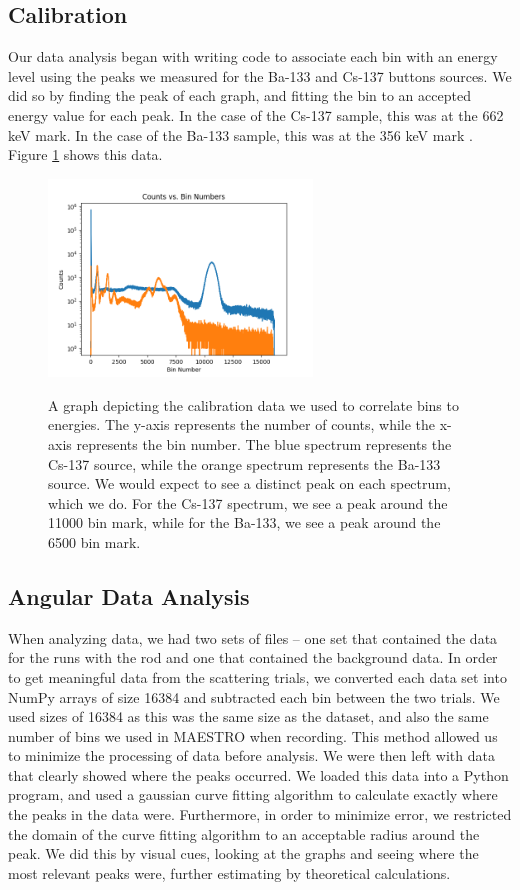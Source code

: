 \documentclass[10pt,letterpaper,onecolumn]{article}
\begin{document}
\subsection{Calibration}
Our data analysis began with writing code to associate each bin with an energy level using the peaks we measured for the Ba-133 and Cs-137 buttons sources. We did so by finding the peak of each graph, and fitting the bin to an accepted energy value for each peak. In the case of the Cs-137 sample, this was at the 662 keV mark\cite{GammaSpectacularCS137}. In the case of the Ba-133 sample, this was at the 356 keV mark \cite{GammaSpectacularBA133}. Figure \ref{fig:calibration} shows this data. 
\begin{figure}[hbt!]
    \begin{center}
        {{\includegraphics[width=7cm]{calib.png} }}%
        \caption{A graph depicting the calibration data we used to correlate bins to energies. The y-axis represents the number of counts, while the x-axis represents the bin number. The blue spectrum represents the Cs-137 source, while the orange spectrum represents the Ba-133 source. We would expect to see a distinct peak on each spectrum, which we do. For the Cs-137 spectrum, we see a peak around the 11000 bin mark, while for the Ba-133, we see a peak around the 6500 bin mark.}%
        \label{fig:calibration}%
    \end{center}
\end{figure}
\subsection{Angular Data Analysis}
When analyzing data, we had two sets of files -- one set that contained the data for the runs with the rod and one that contained the background data. In order to get meaningful data from the scattering trials, we converted each data set into NumPy arrays of size 16384 and subtracted each bin between the two trials. We used sizes of 16384 as this was the same size as the dataset, and also the same number of bins we used in MAESTRO when recording. This method allowed us to minimize the processing of data before analysis. We were then left with data that clearly showed where the peaks occurred. We loaded this data into a Python program, and used a gaussian curve fitting algorithm to calculate exactly where the peaks in the data were. Furthermore, in order to minimize error, we restricted the domain of the curve fitting algorithm to an acceptable radius around the peak. We did this by visual cues, looking at the graphs and seeing where the most relevant peaks were, further estimating by theoretical calculations.
\end{document}
